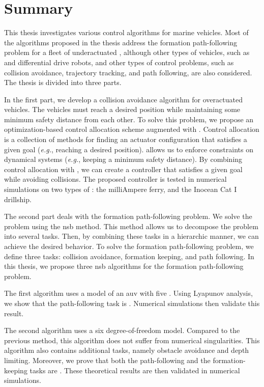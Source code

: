 \chapter*{Summary}

This thesis investigates various control algorithms for marine vehicles.
Most of the algorithms proposed in the thesis address the formation path-following problem for a fleet of underactuated , although other types of vehicles, such as  and differential drive robots, and other types of control problems, such as collision avoidance, trajectory tracking, and path following, are also considered.
The thesis is divided into three parts.

In the first part, we develop a collision avoidance algorithm for overactuated vehicles.
The vehicles must reach a desired position while maintaining some minimum safety distance from each other.
To solve this problem, we propose an optimization-based control allocation scheme augmented with .
Control allocation is a collection of methods for finding an actuator configuration that satisfies a given goal (\emph{e.g.}, reaching a desired position).
 allows us to enforce constraints on dynamical systems (\emph{e.g.}, keeping a minimum safety distance).
By combining control allocation with , we can create a controller that satisfies a given goal while avoiding collisions.
The proposed controller is tested in numerical simulations on two types of : the milliAmpere ferry, and the Inocean Cat I drillship.

The second part deals with the formation path-following problem.
We solve the problem using the \acrlong{nsb} method.
This method allows us to decompose the problem into several tasks.
Then, by combining these tasks in a hierarchic manner, we can achieve the desired behavior.
To solve the formation path-following problem, we define three tasks: collision avoidance, formation keeping, and path following.
In this thesis, we propose three \acrlong{nsb} algorithms for the formation path-following problem.

The first algorithm uses a model of an \acrlong{auv} with five .
Using Lyapunov analysis, we show that the path-following task is .
Numerical simulations then validate this result.

The second algorithm uses a six degree-of-freedom model.
Compared to the previous method, this algorithm does not suffer from numerical singularities.
This algorithm also contains additional tasks, namely obstacle avoidance and depth limiting.
Moreover, we prove that both the path-following and the formation-keeping tasks are .
These theoretical results are then validated in numerical simulations.

